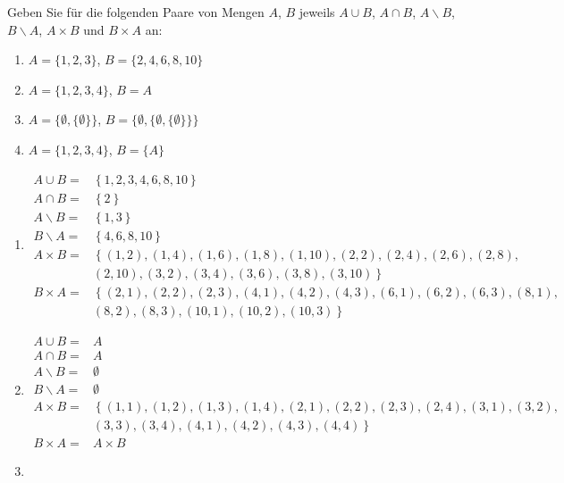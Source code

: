 \documentclass[12pt]{exam}
\begin{document}
\begin{questions}
Geben Sie für die folgenden Paare von Mengen $A$, $B$ jeweils $A\cup B$, $A\cap B$, $A\backslash B$, $B\backslash A$, $A\times B$ und $B\times A$ an:\\
\parbox{0.5\textwidth}{
	\begin{enumerate}
		\item $A=\{1,2,3\}$, $B=\{2,4,6,8,10\}$
		\item $A=\{1,2,3,4\}$, $B=A$
\end{enumerate}}\parbox{0.5\textwidth}{
	\begin{enumerate}\setcounter{enumi}{2}
		\item $A=\{\emptyset,\{\emptyset\}\}$, $B=\{\emptyset,\{\emptyset,\{\emptyset\}\}\}$
		\item $A=\{1,2,3,4\}$, $B=\{A\}$
\end{enumerate}}
\begin{solution}
	\begin{enumerate}
		\item \begin{align*}
			A\cup B =&\left\{1,2,3,4,6,8,10\right\}\\
			A\cap B =&\left\{2\right\}\\
			A\backslash B =&\left\{1,3\right\}\\
			B\backslash A =&\left\{4,6,8,10\right\}\\
			A\times B =&\left\{(1,2),(1,4),(1,6),(1,8),(1,10),(2,2),(2,4),(2,6),(2,8),\right.\\
			&\left.(2,10),(3,2),(3,4),(3,6),(3,8),(3,10)\right\}\\
			B\times A =&\left\{(2,1),(2,2),(2,3),(4,1),(4,2),(4,3),(6,1),(6,2),(6,3),(8,1),\right.\\
			&\left.(8,2),(8,3),(10,1),(10,2),(10,3)\right\}
		\end{align*}
		\item \begin{align*}
			A\cup B =&A\\
			A\cap B =&A\\
			A\backslash B =&\emptyset\\
			B\backslash A =&\emptyset\\
			A\times B =&\left\{(1,1),(1,2),(1,3),(1,4),(2,1),(2,2),(2,3),(2,4),(3,1),(3,2),\right.\\
			&\left.(3,3),(3,4),(4,1),(4,2),(4,3),(4,4)\right\}\\
			B\times A =&A\times B
		\end{align*}
		\item \begin{align*}

\end{align*}
\end{enumerate}
\end{solution}
\end{questions}
\end{document}
